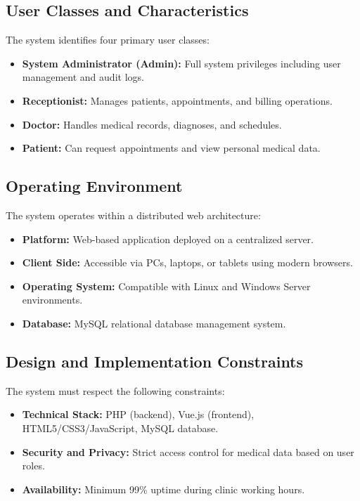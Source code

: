 \subsection{User Classes and Characteristics}

The system identifies four primary user classes:

\begin{itemize}
	\item \textbf{System Administrator (Admin):} Full system privileges including user management and audit logs.
	\item \textbf{Receptionist:} Manages patients, appointments, and billing operations.
	\item \textbf{Doctor:} Handles medical records, diagnoses, and schedules.
	\item \textbf{Patient:} Can request appointments and view personal medical data.
\end{itemize}

\subsection{Operating Environment}

The system operates within a distributed web architecture:

\begin{itemize}
	\item \textbf{Platform:} Web-based application deployed on a centralized server.
	\item \textbf{Client Side:} Accessible via PCs, laptops, or tablets using modern browsers.
	\item \textbf{Operating System:} Compatible with Linux and Windows Server environments.
	\item \textbf{Database:} MySQL relational database management system.
\end{itemize}

\subsection{Design and Implementation Constraints}

The system must respect the following constraints:

\begin{itemize}
	\item \textbf{Technical Stack:} PHP (backend), Vue.js (frontend), HTML5/CSS3/JavaScript, MySQL database.
	\item \textbf{Security and Privacy:} Strict access control for medical data based on user roles.
	\item \textbf{Availability:} Minimum 99\% uptime during clinic working hours.
\end{itemize}

